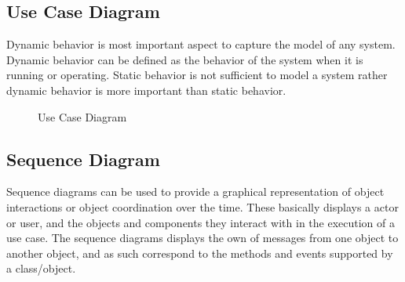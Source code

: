 \documentclass[oneside,a4paper,12pt]{report}
\begin{document}
\newpage
\subsection{Use Case Diagram}
\hspace*{0.5cm} Dynamic behavior is most important aspect to capture the model of any system. Dynamic behavior can be defined as the behavior of the system when it is running or operating. Static behavior is not sufficient to model a system rather dynamic behavior is more important than static behavior.

\begin{center}
	\begin{figure}[!htbp]
		\centering
	    \caption{Use Case Diagram}
	    \label{fig:Use Case Diagram}
	\end{figure}
\end{center}

\newpage
\subsection{Sequence Diagram}
\hspace*{0.5cm} Sequence diagrams can be used to provide a graphical representation of object  interactions or object coordination over the time. These basically displays a actor or user, and the objects and components they interact with in the execution of a use case. The sequence diagrams displays the own of messages from one object to another object, and as such correspond to the methods and events supported by a class/object.
\end{document}
